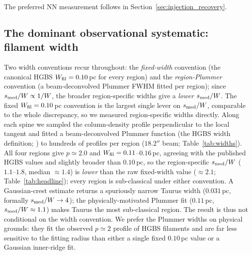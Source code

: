 \documentclass[usenatbib,twoside,twocolumn]{mnras}
\begin{document}
The preferred NN measurement follows in Section~\ref{sec:injection_recovery}.

\subsection{The dominant observational systematic: filament width}
\label{sec:widths}

Two width conventions recur throughout: the \emph{fixed-width} convention (the canonical HGBS $W_{\rm fil}=0.10$\,pc for every region) and the \emph{region-Plummer} convention (a beam-deconvolved Plummer FWHM fitted per region); since $s_{\rm med}/W\propto1/W$, the broader region-specific widths give a \emph{lower} $s_{\rm med}/W$. The fixed $W_{\rm fil}=0.10$\,pc convention is the largest single lever on $s_{\rm med}/W$, comparable to the whole discrepancy, so we measured region-specific widths directly. Along each spine we sampled the column-density profile perpendicular to the local tangent and fitted a beam-deconvolved Plummer function (the HGBS width definition; \citealt{Arzoumanian2019}) to hundreds of profiles per region ($18.2''$ beam; Table~\ref{tab:widths}). All four regions give $p\simeq2.0$ and $W_{\rm fil}=0.11$--$0.16$\,pc, agreeing with the published HGBS values and slightly broader than $0.10$\,pc, so the region-specific $s_{\rm med}/W$ ($1.1$--$1.8$, median $\approx1.4$) is \emph{lower} than the raw fixed-width value ($\approx2.1$; Table~\ref{tab:headline}); every region is sub-classical under either convention. A Gaussian-crest estimate returns a spuriously narrow Taurus width ($0.031$\,pc, formally $s_{\rm med}/W\to4$); the physically-motivated Plummer fit ($0.11$\,pc, $s_{\rm med}/W\approx1.1$) makes Taurus the most sub-classical region. The result is thus not conditional on the width convention. We prefer the Plummer widths on physical grounds: they fit the observed $p\simeq2$ profile of HGBS filaments and are far less sensitive to the fitting radius than either a single fixed $0.10$\,pc value or a Gaussian inner-ridge fit.
\end{document}
